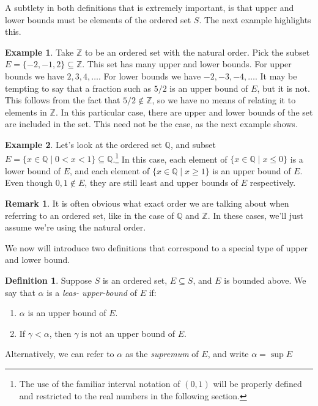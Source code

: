 \documentclass{article}
\newcommand{\Q}{\mathbb{Q}}
\newcommand{\Z}{\mathbb{Z}}
\theoremstyle{definition}
\newtheorem{definition}{Definition}[section]
\newtheorem{example}{Example}[section]
\newtheorem{remark}{Remark}[section]
\begin{document}
	A subtlety in both definitions that is extremely important, is that upper and lower bounds must be elements of the ordered set $ S $. The next example highlights this. 
	\begin{example}
		Take $ \Z $ to be an ordered set with the natural order. Pick the subset $ E=\{-2,-1,2\}\subseteq \Z $. This set has many upper and lower bounds. For upper bounds we have $ 2,3,4,\ldots $. For lower bounds we have $ -2,-3,-4,\ldots
		$. It may be tempting to say that a fraction such as $ 5/2 $ is an upper bound of $ E $, but it is not. This follows from the fact that $ 5/2\notin \Z $, so we have no means of relating it to elements in $ \Z $. In this particular case, there are upper and lower bounds of the set are included in the set. This need not be the case, as the next example shows.  
	\end{example}
	\begin{example}
		Let's look at the ordered set $ \Q $, and subset $ E=\{x\in\Q\mid 0<x<1\}\subseteq \Q $.\footnote{The use of the familiar interval notation of $ (0,1) $ will be properly defined and restricted to the real numbers in the following section.} In this case, each element of $ \{x\in\Q\mid x\le 0\} $ is a lower bound of $ E $, and  each element of $ \{x\in\Q\mid x\ge 1\} $ is an upper bound of $ E $. Even though $ 0,1\notin E $, they are still least and upper bounds of $ E $ respectively. 
	\end{example}
	\begin{remark}
		It is often obvious what exact order we are talking about when referring to an ordered set, like in the case of $ \Q $ and $ \Z $. In these cases, we'll just assume we're using the natural order.  
	\end{remark}
	We now will introduce two definitions that correspond to a special type of upper and lower bound.
	\begin{definition}\label{def1.8}
		Suppose $ S $ is an ordered set, $ E\subseteq S $, and $ E $ is bounded above. We say that $ \alpha $ is a \textit{\color{red}leas- upper-bound} of $ E $ if:
		\begin{enumerate}
			\item $ \alpha $ is an upper bound of $ E $.
			\item If $ \gamma<\alpha $, then $ \gamma $ is not an upper bound of $ E $.
		\end{enumerate}
		Alternatively, we can refer to $ \alpha $ as the \textit{\color{red}supremum} of $ E $, and write $ \alpha=\sup E $
	\end{definition}
\end{document}
